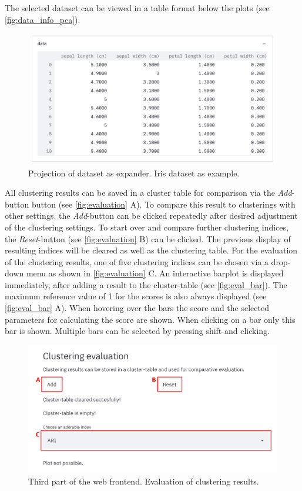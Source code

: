 \documentclass[12pt, english]{article}
\begin{document}
The selected dataset can be viewed in a table format below the plots (see \autoref{fig:data_info_pca}).

\begin{figure}[H]
	\centering
	\includegraphics[width=\linewidth]{modules/web_frontend/data_info_pca.png}
	\caption{Projection of dataset as expander. Iris dataset as example.}\label{fig:data_info_pca}
\end{figure}

All clustering results can be saved in a cluster table for comparison via the \textit{Add}-button button (see \autoref{fig:evaluation} A). To compare this result to clusterings with other settings, the \textit{Add}-button can be clicked repeatedly after desired adjustment of the clustering settings. To start over and compare further clustering indices, the \textit{Reset}-button (see \autoref{fig:evaluation} B) can be clicked. The previous display of resulting indices will be cleared as well as the clustering table.
For the evaluation of the clustering results, one of five clustering indices can be chosen via a drop-down menu as shown in \autoref{fig:evaluation} C. An interactive barplot is displayed immediately, after adding a result to the cluster-table (see \autoref{fig:eval_bar}). The maximum reference value of 1 for the scores is also always displayed (see \autoref{fig:eval_bar} A). When hovering over the bars the score and the selected parameters for calculating the score are shown. When clicking on a bar only this bar is shown. Multiple bars can be selected by pressing shift and clicking.
\begin{figure}[H]
	\centering
	\includegraphics[width=\linewidth]{modules/web_frontend/evaluation_letters}
	\caption{Third part of the web frontend. Evaluation of clustering results.}\label{fig:evaluation}
\end{figure}
\end{document}
